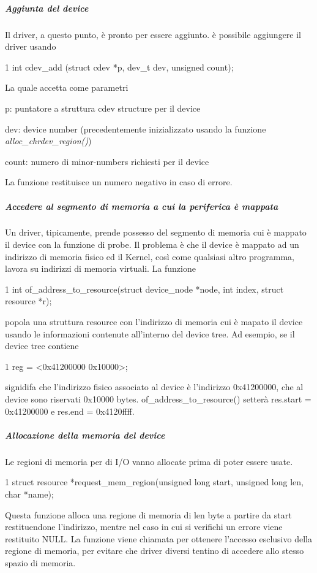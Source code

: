 \subparagraph*{Aggiunta del device}

Il driver, a questo punto, è pronto per essere aggiunto. è possibile aggiungere il driver usando 
\begin{DoxyCode}
1 int cdev\_add (struct cdev *p, dev\_t dev, unsigned count);
\end{DoxyCode}
 La quale accetta come parametri
\begin{DoxyItemize}
\item p\+: puntatore a struttura cdev structure per il device
\item dev\+: device number (precedentemente inizializzato usando la funzione {\itshape alloc\+\_\+chrdev\+\_\+region()})
\item count\+: numero di minor-\/numbers richiesti per il device
\end{DoxyItemize}

La funzione restituisce un numero negativo in caso di errore.

\subparagraph*{Accedere al segmento di memoria a cui la periferica è mappata}

Un driver, tipicamente, prende possesso del segmento di memoria cui è mappato il device con la funzione di probe. Il problema è che il device è mappato ad un indirizzo di memoria fisico ed il Kernel, così come qualsiasi altro programma, lavora su indirizzi di memoria virtuali. La funzione


\begin{DoxyCode}
1 int of\_address\_to\_resource(struct device\_node *node, int index, struct resource *r);
\end{DoxyCode}


popola una struttura resource con l'indirizzo di memoria cui è mapato il device usando le informazioni contenute all'interno del device tree. Ad esempio, se il device tree contiene 
\begin{DoxyCode}
1 reg = <0x41200000 0x10000>;
\end{DoxyCode}
 signidifa che l'indirizzo fisico associato al device è l'indirizzo 0x41200000, che al device sono riservati 0x10000 bytes. of\+\_\+address\+\_\+to\+\_\+resource() setterà res.\+start = 0x41200000 e res.\+end = 0x4120ffff.

\subparagraph*{Allocazione della memoria del device}

Le regioni di memoria per di I/\+O vanno allocate prima di poter essere usate. 
\begin{DoxyCode}
1 struct resource *request\_mem\_region(unsigned long start, unsigned long len, char *name);
\end{DoxyCode}
 Questa funzione alloca una regione di memoria di len byte a partire da start restituendone l'indirizzo, mentre nel caso in cui si verifichi un errore viene restituito N\+U\+L\+L. La funzione viene chiamata per ottenere l'accesso esclusivo della regione di memoria, per evitare che driver diversi tentino di accedere allo stesso spazio di memoria.

